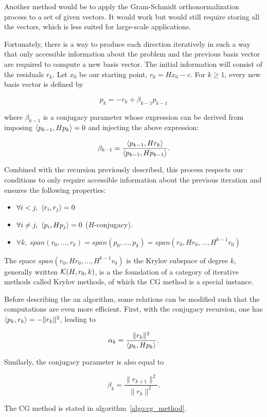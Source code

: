 \documentclass[10pt]{article}
\numberwithin{equation}{section}
\begin{document}
	Another method would be to apply the Gram-Schmidt orthonormalization process to a set of given vectors. It would work but would still require storing all the vectors, which is less suited for large-scale applications. 
	
	Fortunately, there is a way to produce each direction iteratively in such a way that only accessible information about the problem and the previous basis vector are required to compute a new basis vector. The initial information will consist of the residuals $r_k$. Let $x_0$ be our starting point, $r_0=Hx_0-c$. For $k\ge 1$, every new basis vector is defined by
	
	\[p_k = -r_k + \beta_{k-1} p_{k-1}\]
	
	where $\beta_{k-1}$ is a conjugacy parameter whose expression can be derived from imposing $\left\langle {p_{k-1}} , {Hp_k} \right\rangle=0$ and injecting the above expression:
	
	\[ \beta_{k-1} = \dfrac{\left\langle {p_{k-1}} , {Hr_k} \right\rangle}{\left\langle {p_{k-1}} , {Hp_{k-1}} \right\rangle}.\]
	
	Combined with the recursion previously described, this process respects our conditions to only require accessible information about the previous iteration and ensures the following properties:
	\begin{itemize}
		\item $\forall i<j,\ \scal{r_i}{r_j}=0$
		\item $\forall i\neq j,\ \scal{p_i}{Hp_j}=0$ ($H$-conjugacy).
		\item $\forall k,\ span(r_0,\ldots,r_k) = span(p_0,\ldots,p_k) = span(r_0,Hr_0,\ldots,H^{k-1}r_0)$
	\end{itemize}
	
	The space $span(r_0,Hr_0,\ldots,H^{k-1}r_0)$ is the Krylov subspace of degree $k$, generally written ${\mathcal{K}}(H,r_0,k)$, is a the foundation of a category of iterative methods called Krylov methods, of which the CG method is a special instance. 
	
	Before describing the an algorithm, some relations can be modified such that the computations are even more efficient. First, with the conjugacy recursion, one has $\left\langle {p_k} , {r_k} \right\rangle = - \|r_k\|^2$, leading to 
	
	\[\alpha_k = \dfrac{\|r_k\|^2}{\left\langle {p_k} , {Hp_k} \right\rangle}.\]
	
	Similarly, the conjugacy parameter is also equal to 
	
	\[\beta_k = \dfrac{\|r_{k+1}\|^2}{\|r_k\|^2}.\]
	
	The CG method is stated in algorithm~\ref{algo:cg_method}.
	
\end{document}
